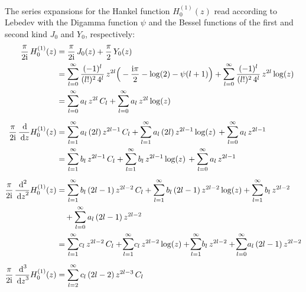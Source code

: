 \newpage
The series expansions for the Hankel function $H_0^{(1)}(z)$ read according to Lebedev \cite[Sec.\@~5.6]{lebedev} with the Digamma function $\psi$ and the Bessel functions of the first and second kind $J_0$ and $Y_0$, respectively:
\begin{align*}
  \frac{\pi}{2 \ii} \, H_0^{(1)}(z)
  &= \frac{\pi}{2\ii} \, J_0(z) + \frac{\pi}{2}\, Y_0(z) \\
  &= \mathlarger{\sum}_{l = 0}^\infty \, \frac{(-1)^l}{(l!)^2 \, 4^l} \,  z^{2l} \Big( -\frac{\ii \pi}{2} - \log(2) - \psi(l + 1) \Big) 
  +  \mathlarger{\sum}_{l = 0}^\infty \, \frac{(-1)^l}{(l!)^2 \, 4^l} \,  z^{2l} \log(z) \\
  &= \mathlarger{\sum}_{l = 0}^\infty \, a_l \,  z^{2l} \, C_l 
   + \mathlarger{\sum}_{l = 0}^\infty \, a_l  \,z^{2l} \log(z) \\[0.5em]
  \frac{\pi}{2\ii} \, \frac{\d{}}{\d z} H_0^{(1)}(z)
  &= \mathlarger{\sum}_{l = 1}^\infty \, a_l \,  (2l) \, z^{2l - 1} \, C_l 
  + \mathlarger{\sum}_{l = 1}^\infty \, a_l \, (2l)  \, z^{2l - 1} \log(z) \, 
  + \mathlarger{\sum}_{l = 0}^\infty \, a_l \, z^{2l - 1} \\
  &= \mathlarger{\sum}_{l = 1}^\infty \, b_l \, z^{2l - 1} \, C_l 
  + \mathlarger{\sum}_{l = 1}^\infty \, b_l \, z^{2l - 1} \log(z) \, 
  +  \mathlarger{\sum}_{l = 0}^\infty \, a_l \, z^{2l - 1} \\[0.5em]
  \frac{\pi}{2\ii} \, \frac{\d{}^2}{\d z^2} H_0^{(1)}(z)
  &= \mathlarger{\sum}_{l = 1}^\infty \, b_l \, (2l - 1) \, z^{2l - 2} \, C_l 
  + \mathlarger{\sum}_{l = 1}^\infty \, b_l \, (2l - 1)\, z^{2l - 2} \log(z) 
  + \mathlarger{\sum}_{l = 1}^\infty \, b_l \, z^{2l - 2}\\
  &\quad + \mathlarger{\sum}_{l = 0}^\infty \, a_l \, (2l - 1) \, z^{2l - 2} \\
  &=   \mathlarger{\sum}_{l = 1}^\infty c_l \, z^{2l - 2} \, C_l 
  +  \!\mathlarger{\sum}_{l = 1}^\infty c_l \, z^{2l - 2} \log(z) 
  +  \!\mathlarger{\sum}_{l = 1}^\infty b_l \, z^{2l - 2} 
  +  \!\mathlarger{\sum}_{l = 0}^\infty a_l \, (2l - 1) \, z^{2l - 2} \\[0.5em]
  \frac{\pi}{2\ii} \, \frac{\d{}^3}{\d z^3} H_0^{(1)}(z)
  &= \sum_{l = 2}^\infty c_l \, (2l - 2) \, z^{2l - 3} \, C_l 

\end{align*}
